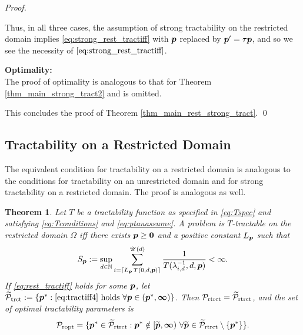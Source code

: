 \documentclass[sort&compress]{elsarticle}
\newcommand{\theUB}{\mathscr{U}}
\newtheorem{theorem}{Theorem}
\begin{document}
\begin{proof}
\begin{enumerate}
\end{enumerate}
Thus, in all three cases, the assumption of strong tractability on the restricted domain implies \eqref{eq:strong_rest_tractiff} with $\boldsymbol{p}$ replaced by $\boldsymbol{p}' = \tau \boldsymbol{p}$, and so we see the necessity of $\eqref{eq:strong_rest_tractiff}$.

\bigskip
\noindent \textbf{Optimality:} \\ 
The proof of optimality is analogous to that for Theorem \ref{thm_main_strong_tract2} and is omitted.

\bigskip

\noindent This concludes the proof of  Theorem \ref{thm_main_rest_strong_tract}.  \qed
\end{proof}

\subsection{Tractability on a Restricted Domain}


The equivalent condition for tractability on a restricted domain is analogous to the conditions for tractability on an unrestricted domain and for strong tractability on a restricted domain.  The proof is analogous as well.

\begin{theorem}\label{thm_main_rest_tract}
Let $T$ be a tractability function as specified in \eqref{eq:Tspec} and satisfying \eqref{eq:Tconditions} and \eqref{eq:ptauassume}.  A problem is $T$-tractable on the restricted domain $\Omega$ iff there exists $\boldsymbol{p}\ge \boldsymbol{0}$ and a positive constant $L_{\boldsymbol{p}}$ such that
\begin{equation} \label{eq:rest_tractiff}
     S_{\vp}:=\sup_{d \in \naturals}
     \sum_{i = \lceil L_{\vp}\, T(0,d,\vp) \rceil}^{\theUB(d)} \frac{1}{T(\lambda^{-1}_{i,d},d,\vp)}< \infty.
\end{equation}
If \eqref{eq:rest_tractiff} holds for some $\boldsymbol{p}$, let $\widetilde{\mathcal{P}}_{\textup{trct}} : = \{\boldsymbol{p}^* : \eqref{eq:tractiff4} \text{ holds }\forall \boldsymbol{p} \in (\boldsymbol{p}^*,\boldsymbol{\infty}) \}$.
Then $\mathcal{P}_{\textup{rtrct}} = \widetilde{\mathcal{P}}_{\textup{rtrct}}$, and the set of optimal  tractability parameters is
\[
\mathcal{P}_{\textup{ropt}} =
\{\boldsymbol{p}^* \in \widetilde{\mathcal{P}}_{\textup{rtrct}} :  \boldsymbol{p}^* \notin [\widetilde{\boldsymbol{p}},\boldsymbol{\infty}) \ \forall \widetilde{\boldsymbol{p}}\in  \widetilde{\mathcal{P}}_{\textup{rtrct}} \setminus \{\boldsymbol{p}^*\} \}.
\]
\end{theorem}
\end{document}
